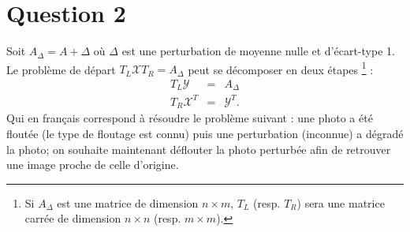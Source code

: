 \section{Question 2}
Soit $A_{\Delta} = A + \Delta$ où $\Delta$ est une perturbation de moyenne nulle et d'écart-type 1. Le problème de départ $T_L \mathcal{X} T_R = A_{\Delta}$ peut se décomposer en deux étapes \footnote{Si $A_{\Delta}$
est une matrice de dimension $n \times m$, $T_L$ (resp. $T_R$) sera une matrice carrée de dimension $n \times n$ (resp. $m \times m$).} :
\begin{eqnarray}
  \label{eq_q2}
  T_L \mathcal{Y} &=& A_{\Delta}\\
  \label{eq_q2'}
  T_R \mathcal{X}^T &=& \mathcal{Y}^T.
\end{eqnarray}
Qui en français correspond à résoudre le problème suivant : une photo a été floutée (le type de floutage est connu) puis une perturbation (inconnue) a dégradé la photo; on souhaite maintenant déflouter la photo perturbée afin de retrouver une image proche de celle d'origine.




